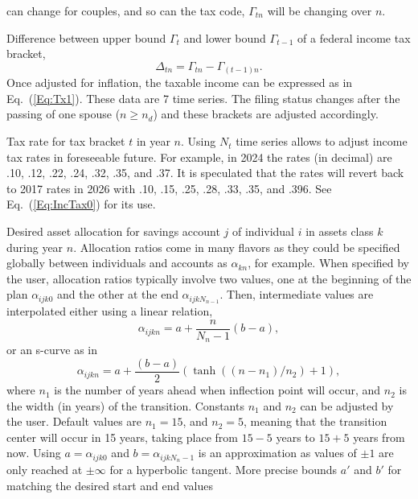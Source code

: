 \documentclass{report}[fleqn,12pt]
\begin{document}
\begin{description}[leftmargin=4em,style=multiline]
		can change for couples, and so can the tax code, $\Gamma_{tn}$ will be changing over $n$.
\item [$\Delta_{tn}$]
	Difference between upper bound $\Gamma_t$ and lower bound $\Gamma_{t-1}$
	of a federal income tax bracket,
	\begin{equation}
		\Delta_{tn} = \Gamma_{tn} - \Gamma_{(t-1)n}.
	\end{equation}
	Once adjusted for inflation,
	the taxable income can be expressed as in Eq.~(\ref{Eq:Tx1}). These data are 7 time series.
	The filing status changes after the passing of one spouse ($n \ge n_d$) and these
	brackets are adjusted accordingly.
\item [$\theta_{tn}$]
	Tax rate for tax bracket $t$ in year $n$. Using $N_t$ time series allows to adjust income
	tax rates in foreseeable future.
	For example, in 2024 the rates (in decimal) are .10, .12, .22, .24, .32, .35, and .37.
	It is speculated that the rates will revert back to 2017 rates in 2026 with
	.10, .15, .25, .28, .33, .35, and .396. See Eq.~(\ref{Eq:IncTax0}) for its use.
\item [$\alpha_{ijkn}$]
	Desired asset allocation for savings account $j$ of individual $i$ in
	assets class $k$ during year $n$.
	Allocation ratios come in many flavors as they could be specified globally between
	individuals and accounts as $\alpha_{kn}$, for example.
	When specified by the user, allocation ratios typically involve two values, one at the
	beginning of the plan $\alpha_{ijk0}$ and the other at the end
	$\alpha_{ijkN_{n-1}}$. Then, intermediate values are interpolated either using
	a linear relation,
\begin{equation}
	\alpha_{ijkn} = a + \frac{n}{N_n - 1} (b - a),
\end{equation}
or an s-curve as in
\begin{equation}
	\alpha_{ijkn} = a + \frac{(b - a)}{2}
	(\tanh((n-n_1)/n_2) + 1),
\end{equation}
	where $n_1$ is the number of years ahead when inflection point will occur, and $n_2$ is the
	width (in years) of the transition. Constants $n_1$ and $n_2$ can be adjusted by the user.
	Default values are $n_1 = 15$, and $n_2 = 5$, meaning that the transition center will occur
	in 15 years, taking place from $15-5$ years to $15+5$ years from now.
	Using $a = \alpha_{ijk0}$ and $b = \alpha_{ijkN_n-1}$ is an approximation as values of $\pm 1$
	are only reached at $\pm \infty$ for a hyperbolic tangent.
	More precise bounds $a'$ and $b'$ for matching the desired start and end values

\end{description}
\end{document}
